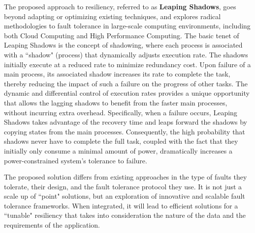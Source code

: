 The proposed approach to resiliency, referred to as \textbf{Leaping Shadows}, goes beyond adapting or optimizing existing techniques, and explores radical methodologies to fault tolerance in large-scale computing environments, including both Cloud Computing and High Performance Computing. The basic tenet of Leaping Shadows is the concept of shadowing, where each process is associated with a ``shadow" (process) that dynamically adjusts execution rate. The shadows initially execute at a reduced rate to minimize redundancy cost. Upon failure of a main process, its associated shadow increases its rate to complete the task, thereby reducing the impact of such a failure on the progress of other tasks. The dynamic and differential control of execution rates provides a unique opportunity that allows the lagging shadows to benefit from the faster main processes, without incurring extra overhead. Specifically, when a failure occurs, Leaping Shadows takes advantage of the recovery time and leaps forward the shadows by copying states from the main processes. Consequently, the high probability that shadows never have to complete the full task, coupled with the fact that they initially only consume a minimal amount of power, dramatically increases a power-constrained system’s tolerance to failure.

The proposed solution differs from existing approaches in the type of faults they tolerate, their design, and the fault tolerance protocol they use. It is not just a scale up of  ``point" solutions, but an exploration of innovative and scalable fault tolerance frameworks. When integrated, it will lead to efficient solutions for a ``tunable" resiliency that takes into consideration the nature of the data and the requirements of the application.

